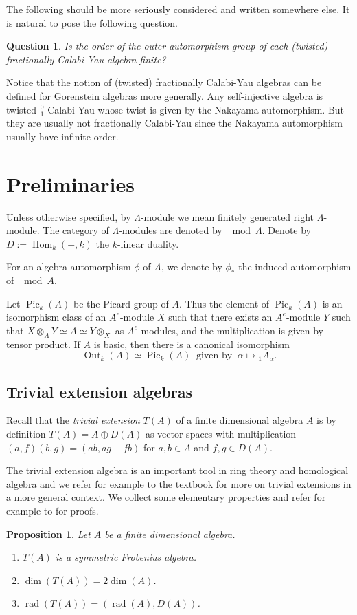 \documentclass[a4paper,reqno,11pt]{amsart}
\newtheorem{proposition}[theorem]{Proposition}
\newtheorem{question}[theorem]{Question}
\theoremstyle{definition}
\newcommand{\Out}{\operatorname{Out}\nolimits}\newcommand{\Pic}{\operatorname{Pic}\nolimits}
\newcommand{\Hom}{\operatorname{Hom}\nolimits}
\newcommand{\rad}{\operatorname{rad}\nolimits}
\newcommand{\new}[1]{{\blue #1}}
\renewcommand{\comment}[1]{{\color{green!50!gray} #1}}
\numberwithin{equation}{section}
\begin{document}
\comment{The following should be more seriously considered and written somewhere else.}
It is natural to pose the following question.

\begin{question}
Is the order of the outer automorphism group of each (twisted)  fractionally Calabi-Yau algebra finite?
\end{question}

Notice that the notion of (twisted) fractionally Calabi-Yau algebras can be defined for Gorenstein algebras more generally. Any self-injective algebra is twisted $\frac{0}{1}$-Calabi-Yau whose twist is given by the Nakayama automorphism. But they are usually not fractionally Calabi-Yau since the Nakayama automorphism usually have infinite order.


\section{Preliminaries}

Unless otherwise specified, by $\Lambda$-module we mean finitely generated right $\Lambda$-module.
The category of $\Lambda$-modules are denoted by $\mod \Lambda$.
Denote by $D:=\Hom_k(-,k)$ the $k$-linear duality.
\new{For an algebra automorphism $\phi$ of $A$, we denote by $\phi_*$ the induced automorphism of $\mod A$.

Let $\Pic_k(A)$ be the Picard group of $A$. Thus the element of $\Pic_k(A)$ is an isomorphism class of an $A^e$-module $X$ such that there exists an $A^e$-module $Y$ such that $X\otimes_AY\simeq A\simeq Y\otimes_X$ as $A^e$-modules, and the multiplication is given by tensor product.
If $A$ is basic, then there is a canonical isomorphism
\[\Out_k(A)\simeq\Pic_k(A)\ \mbox{ given by }\ \alpha\mapsto{}_1A_\alpha.\]
}


\subsection{Trivial extension algebras}
Recall that the \emph{trivial extension} $T(A)$ of a finite dimensional algebra $A$ is by definition $T(A)=A \oplus D(A)$ as vector spaces with multiplication $(a,f)(b,g)=(ab,ag+fb)$ for $a,b \in A$ and $f,g \in D(A)$.

The trivial extension algebra is an important tool in ring theory and homological algebra and we refer for example to the textbook \cite{FGR} for more on trivial extensions in a more general context.
We collect some elementary properties and refer for example to \cite{SY} for proofs.
\begin{proposition} \label{propotrivext}
Let $A$ be a finite dimensional algebra.
\begin{enumerate}
\item $T(A)$ is a symmetric Frobenius algebra.
\item $\dim(T(A))=2 \dim(A)$.
\item $\rad(T(A))=(\rad(A),D(A))$.
\end{enumerate}

\end{proposition}
\end{document}
